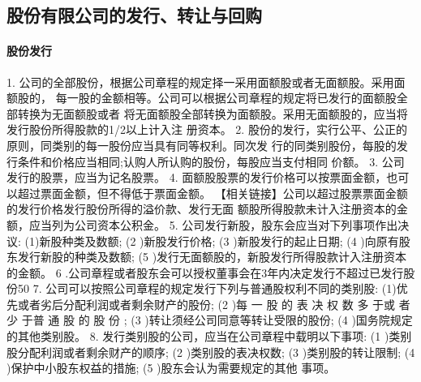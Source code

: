 \documentclass[UTF8,12pt]{ctexart}
\numberwithin{equation}{section} %
\numberwithin{figure}{section}
\numberwithin{table}{section}
\begin{document}
	
	\subsection{股份有限公司的发行、转让与回购}
	\paragraph{股份发行}
	1. 公司的全部股份，根据公司章程的规定择一采用面额股或者无面额股。采用面额股的， 每一股的金额相等。公司可以根据公司章程的规定将已发行的面额股全部转换为无面额股或者 将无面额股全部转换为面额股。采用无面额股的，应当将发行股份所得股款的1/2以上计入注 册资本。
	2. 股份的发行，实行公平、公正的原则，同类别的每一股份应当具有同等权利。同次发 行的同类别股份，每股的发行条件和价格应当相同;认购人所认购的股份，每股应当支付相同 价额。
	3. 公司发行的股票，应当为记名股票。
	4. 面额股股票的发行价格可以按票面金额，也可以超过票面金额，但不得低于票面金额。
	【相关链接】公司以超过股票票面金额的发行价格发行股份所得的溢价款、发行无面 额股所得股款未计入注册资本的金额，应当列为公司资本公积金。
	5. 公司发行新股，股东会应当对下列事项作出决议:
	(1)新股种类及数额;
	(2 )新股发行价格;
	(3 )新股发行的起止日期;
	(4 )向原有股东发行新股的种类及数额;
	(5 )发行无面额股的，新股发行所得股款计入注册资本的金额。
	6 .公司章程或者股东会可以授权董事会在3年内决定发行不超过已发行股份50%
	7. 公司可以按照公司章程的规定发行下列与普通股权利不同的类别股: (1)优先或者劣后分配利润或者剩余财产的股份;
	(2 )每 一 股 的 表 决 权 数 多 于或 者 少 于普 通 股 的 股 份 ;
	(3 )转让须经公司同意等转让受限的股份;
	(4 )国务院规定的其他类别股。
	8. 发行类别股的公司，应当在公司章程中载明以下事项:
	(1 )类别股分配利润或者剩余财产的顺序;
	(2 )类别股的表决权数;
	(3 )类别股的转让限制;
	(4 )保护中小股东权益的措施;
	(5 )股东会认为需要规定的其他 事项。
	
\end{document}
